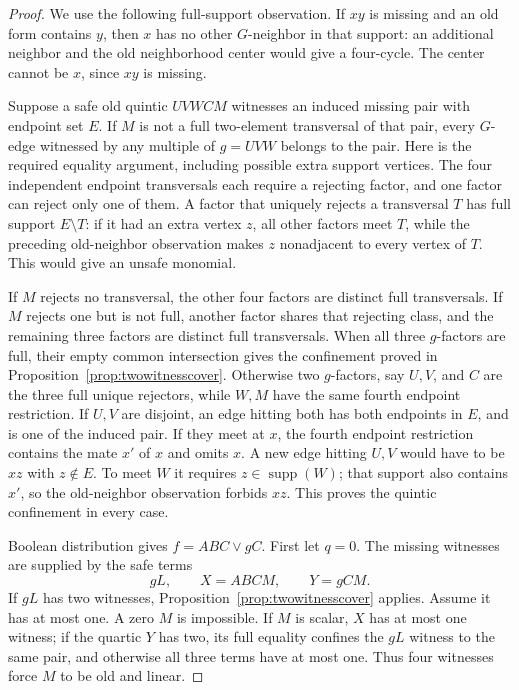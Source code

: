 \documentclass[11pt]{article}
\newcommand{\supp}{\operatorname{supp}}
\theoremstyle{definition}
\theoremstyle{remark}
\begin{document}
\begin{proof}
We use the following full-support observation. If $xy$ is missing and an
old form contains $y$, then $x$ has no other $G$-neighbor in that support:
an additional neighbor and the old neighborhood center would give a
four-cycle. The center cannot be $x$, since $xy$ is missing.

Suppose a safe old quintic $UV WCM$ witnesses an induced missing pair
with endpoint set $E$. If $M$ is not a full two-element transversal of
that pair, every $G$-edge witnessed by any multiple of $g=UVW$ belongs
to the pair. Here is the required equality argument, including possible
extra support vertices. The four independent endpoint transversals each
require a rejecting factor, and one factor can reject only one of them.
A factor that uniquely rejects a transversal $T$ has full support
$E\setminus T$: if it had an extra vertex $z$, all other factors meet
$T$, while the preceding old-neighbor observation makes $z$ nonadjacent
to every vertex of $T$. This would give an unsafe monomial.

If $M$ rejects no transversal, the other four factors are distinct full
transversals. If $M$ rejects one but is not full, another factor shares
that rejecting class, and the remaining three factors are distinct full
transversals. When all three $g$-factors are full, their empty common
intersection gives the confinement proved in
Proposition~\ref{prop:twowitnesscover}. Otherwise two $g$-factors, say
$U,V$, and $C$ are the three full unique rejectors, while $W,M$ have the
same fourth endpoint restriction. If $U,V$ are disjoint, an edge hitting
both has both endpoints in $E$, and is one of the induced pair. If they
meet at $x$, the fourth endpoint restriction contains the mate $x'$ of
$x$ and omits $x$. A new edge hitting $U,V$ would have to be $xz$ with
$z\notin E$. To meet $W$ it requires $z\in\supp(W)$; that support also
contains $x'$, so the old-neighbor observation forbids $xz$. This proves
the quintic confinement in every case.

Boolean distribution gives $f=ABC\vee gC$. First let $q=0$. The missing
witnesses are supplied by the safe terms
\[
 gL,\qquad X=ABCM,\qquad Y=gCM.
\]
If $gL$ has two witnesses, Proposition~\ref{prop:twowitnesscover} applies.
Assume it has at most one. A zero $M$ is impossible. If $M$ is scalar,
$X$ has at most one witness; if the quartic $Y$ has two, its full equality
confines the $gL$ witness to the same pair, and otherwise all three terms
have at most one. Thus four witnesses force $M$ to be old and linear.


\end{proof}
\end{document}
